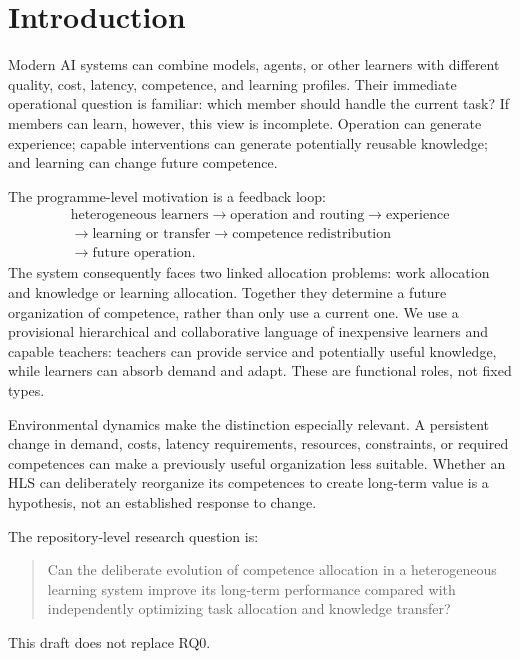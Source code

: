 \section{Introduction}

Modern AI systems can combine models, agents, or other learners with different quality, cost, latency, competence, and learning profiles. Their immediate operational question is familiar: which member should handle the current task? If members can learn, however, this view is incomplete. Operation can generate experience; capable interventions can generate potentially reusable knowledge; and learning can change future competence.

The programme-level motivation is a feedback loop:
\begin{equation}
\begin{gathered}
\text{heterogeneous learners} \rightarrow \text{operation and routing} \rightarrow \text{experience}\\
\rightarrow \text{learning or transfer} \rightarrow \text{competence redistribution}\\
\rightarrow \text{future operation}.
\end{gathered}
\label{eq:cycle}
\end{equation}
The system consequently faces two linked allocation problems: work allocation and knowledge or learning allocation. Together they determine a future organization of competence, rather than only use a current one. We use a provisional hierarchical and collaborative language of inexpensive learners and capable teachers: teachers can provide service and potentially useful knowledge, while learners can absorb demand and adapt. These are functional roles, not fixed types.

Environmental dynamics make the distinction especially relevant. A persistent change in demand, costs, latency requirements, resources, constraints, or required competences can make a previously useful organization less suitable. Whether an HLS can deliberately reorganize its competences to create long-term value is a hypothesis, not an established response to change.

The repository-level research question is:
\begin{quote}
Can the deliberate evolution of competence allocation in a heterogeneous learning system improve its long-term performance compared with independently optimizing task allocation and knowledge transfer?
\end{quote}
This draft does not replace RQ0.

